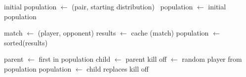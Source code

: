 \documentclass{article}
\begin{document}
  \begin{algorithmic}[1]
  \STATE initial population $\gets$ (pair, starting distribution) \
  \STATE population $\gets$ initial population

        \STATE match $\gets$ (player, opponent)
        \STATE results $\gets$ cache (match)
        \ENDFOR
      \ENDFOR
      \STATE population $\gets$ sorted(results)

      \STATE parent $\gets$  first in population
      \STATE child $\gets$ parent
      \STATE kill off $\gets$ random player from population
      \STATE population $\gets$   child replaces kill off
    \ENDWHILE
  \end{algorithmic}
\end{document}
